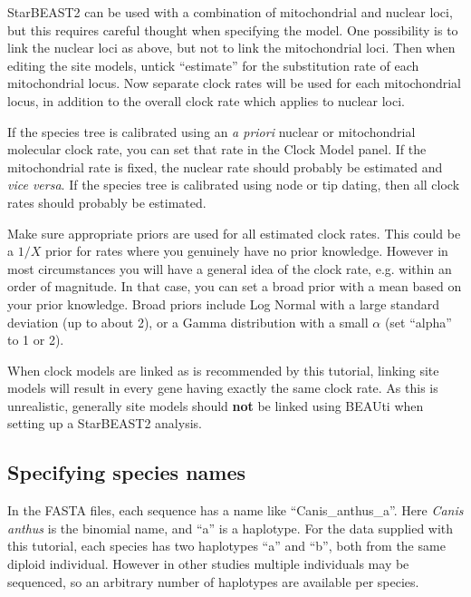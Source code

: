 \documentclass[12pt]{article}
\begin{document}
\begin{tcolorbox}[colback=green!5,colframe=green!40!black,title=Mixing nuclear and mitochondrial loci]
StarBEAST2 can be used with a combination of mitochondrial and nuclear loci, but this requires careful thought when specifying the model. One possibility is to link the nuclear loci as above, but not to link the mitochondrial loci. Then when editing the site models, untick ``estimate'' for the substitution rate of each mitochondrial locus. Now separate clock rates will be used for each mitochondrial locus, in addition to the overall clock rate which applies to nuclear loci.

If the species tree is calibrated using an \textit{a priori} nuclear or mitochondrial molecular clock rate, you can set that rate in the Clock Model panel. If the mitochondrial rate is fixed, the nuclear rate should probably be estimated and \textit{vice versa}. If the species tree is calibrated using node or tip dating, then all clock rates should probably be estimated.

Make sure appropriate priors are used for all estimated clock rates. This could be a $1/X$ prior for rates where you genuinely have no prior knowledge. However in most circumstances you will have a general idea of the clock rate, e.g. within an order of magnitude. In that case, you can set a broad prior with a mean based on your prior knowledge. Broad priors include Log Normal with a large standard deviation (up to about 2), or a Gamma distribution with a small $\alpha$ (set ``alpha'' to 1 or 2).
\end{tcolorbox}

\begin{tcolorbox}[colback=purple!5,colframe=purple!40!black,title=Linking site models]
When clock models are linked as is recommended by this tutorial, linking site models will result in every gene having exactly the same
clock rate. As this is unrealistic, generally site models should \textbf{not}
be linked using BEAUti when setting up a StarBEAST2 analysis.
\end{tcolorbox}

\subsection{Specifying species names}
\label{subsec:speciesNames}

In the FASTA files, each sequence has a name like ``Canis\_anthus\_a''.
Here \textit{Canis anthus} is the binomial name, and ``a'' is a haplotype.
For the data supplied with this tutorial, each species has two haplotypes ``a'' and ``b'', both from
the same diploid individual. However in other studies multiple individuals may
be sequenced, so an arbitrary number of haplotypes are available per species.
\end{document}
